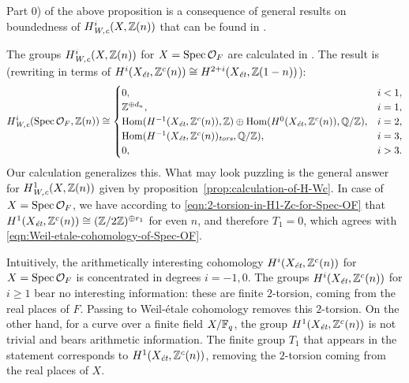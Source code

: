 \documentclass{article}
\numberwithin{equation}{section}
\begin{document}
\begin{remark}
  Part 0) of the above proposition is a consequence of general results on
  boundedness of $H^i_\Wc (X,\ZZ(n))$ that can be found in
  \cite[\S 7]{Beshenov-Weil-etale-1}.
\end{remark}

\begin{remark}
  The groups $H^i_\Wc (X, \ZZ(n))$ for $X = \Spec \mathcal{O}_F$ are calculated
  in \cite[\S 5.8.3]{Flach-Morin-2018}. The result is (rewriting in terms of
  $H^i (X_\et, \ZZ^c(n)) \cong H^{2+i} (X_\et, \ZZ (1-n))$):
  \begin{equation}
    \label{eqn:Weil-etale-cohomology-of-Spec-OF}
    H^i_\Wc (\Spec \mathcal{O}_F, \ZZ(n)) \cong
    \begin{cases}
      0, & i < 1, \\
      \ZZ^{\oplus d_n}, & i = 1, \\
      \Hom (H^{-1} (X_\et, \ZZ^c (n)), \ZZ) \oplus \Hom (H^0 (X_\et, \ZZ^c (n)), \QQ/\ZZ), & i = 2, \\
      \Hom (H^{-1} (X_\et, \ZZ^c (n))_\tors, \QQ/\ZZ), & i = 3, \\
      0, & i > 3.
    \end{cases}
  \end{equation}
  Our calculation generalizes this. What may look puzzling is the general answer
  for $H^1_\Wc (X,\ZZ(n))$ given by
  proposition~\ref{prop:calculation-of-H-Wc}. In case of
  $X = \Spec \mathcal{O}_F$, we have according to
  \eqref{eqn:2-torsion-in-H1-Zc-for-Spec-OF} that
  $H^1 (X_\et, \ZZ^c(n)) \cong (\ZZ/2\ZZ)^{\oplus r_1}$ for even $n$, and
  therefore $T_1 = 0$, which agrees with
  \eqref{eqn:Weil-etale-cohomology-of-Spec-OF}.

  Intuitively, the arithmetically interesting cohomology $H^i (X_\et, \ZZ^c(n))$
  for $X = \Spec \mathcal{O}_F$ is concentrated in degrees $i = -1,0$. The
  groups $H^i (X_\et, \ZZ^c (n))$ for $i \ge 1$ bear no interesting information:
  these are finite $2$-torsion, coming from the real places of $F$. Passing to
  Weil-étale cohomology removes this $2$-torsion. On the other hand, for a curve
  over a finite field $X/\FF_q$, the group $H^1 (X_\et, \ZZ^c (n))$ is not
  trivial and bears arithmetic information. The finite group $T_1$ that appears
  in the statement corresponds to $H^1 (X_\et, \ZZ^c (n))$, removing the
  $2$-torsion coming from the real places of $X$.
\end{remark}
\end{document}
